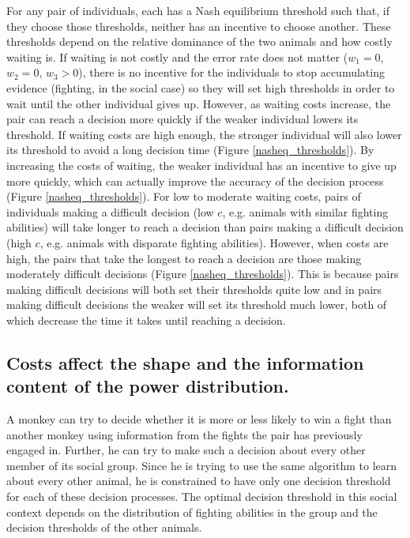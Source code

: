 \documentclass{article}
\begin{document}
For any pair of individuals, each has a Nash equilibrium threshold such that, if they choose those thresholds, neither has an incentive to choose another.  These thresholds depend on the relative dominance of the two animals and how costly waiting is.  If waiting is not costly and the error rate does not matter ($w_1=0$, $w_2=0$, $w_3>0$), there is no incentive for the individuals to stop accumulating evidence (fighting, in the social case) so they will set high thresholds in order to wait until the other individual gives up.  However, as waiting costs increase, the pair can reach a decision more quickly if the weaker individual lowers its threshold.  If waiting costs are high enough, the stronger individual will also lower its threshold to avoid a long decision time (Figure \ref{nasheq_thresholds}).  By increasing the costs of waiting, the weaker individual has an incentive to give up more quickly, which can actually improve the accuracy of the decision process (Figure \ref{nasheq_thresholds}).  For low to moderate waiting costs, pairs of individuals making a difficult decision (low $c$, e.g. animals with similar fighting abilities) will take longer to reach a decision than pairs making a difficult decision (high $c$, e.g. animals with disparate fighting abilities).  However, when costs are high, the pairs that take the longest to reach a decision are those making moderately difficult decisions (Figure \ref{nasheq_thresholds}).  This is because pairs making difficult decisions will both set their thresholds quite low and in pairs making difficult decisions the weaker will set its threshold much lower, both of which decrease the time it takes until reaching a decision. 

\subsection{Costs affect the shape and the information content of the power distribution.  }
A monkey can try to decide whether it is more or less likely to win a fight than another monkey using information from the fights the pair has previously engaged in.  Further, he can try to make such a decision about every other member of its social group.  Since he is trying to use the same algorithm to learn about every other animal, he is constrained to have only one decision threshold for each of these decision processes.  The optimal decision threshold in this social context depends on the distribution of fighting abilities in the group and the decision thresholds of the other animals. 
\end{document}
